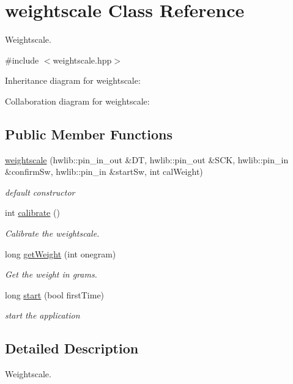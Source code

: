 \hypertarget{classweightscale}{}\section{weightscale Class Reference}
\label{classweightscale}


Weightscale.  




{\ttfamily \#include $<$weightscale.\+hpp$>$}



Inheritance diagram for weightscale\+:


Collaboration diagram for weightscale\+:
\subsection*{Public Member Functions}
\begin{DoxyCompactItemize}
\item 
\hyperlink{classweightscale_af3fdbd1531f9a9e35e8ca02d52d5233d}{weightscale} (hwlib\+::pin\+\_\+in\+\_\+out \&DT, hwlib\+::pin\+\_\+out \&S\+CK, hwlib\+::pin\+\_\+in \&confirm\+Sw, hwlib\+::pin\+\_\+in \&start\+Sw, int cal\+Weight)
\begin{DoxyCompactList}\small\item\em default constructor \end{DoxyCompactList}\item 
int \hyperlink{classweightscale_a37e3e26203e4036b76d2921dc7f3d25c}{calibrate} ()
\begin{DoxyCompactList}\small\item\em Calibrate the weightscale. \end{DoxyCompactList}\item 
long \hyperlink{classweightscale_a8ade4a94ff398976d4378d47bfa5a378}{get\+Weight} (int onegram)
\begin{DoxyCompactList}\small\item\em Get the weight in grams. \end{DoxyCompactList}\item 
long \hyperlink{classweightscale_acc00962ffad1671326cf059bdbb3f684}{start} (bool first\+Time)
\begin{DoxyCompactList}\small\item\em start the application \end{DoxyCompactList}\end{DoxyCompactItemize}


\subsection{Detailed Description}
Weightscale. 

